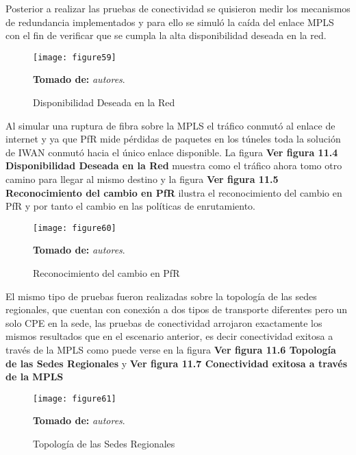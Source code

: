 Posterior a realizar las pruebas de conectividad se quisieron medir los mecanismos de redundancia implementados y para ello se simuló la caída del enlace MPLS con el fin de verificar que se cumpla la alta disponibilidad deseada en la red.


\begin{figure}[htbp]
  \centering
    {\texttt{[image: figure59]}}%
  \caption{ Disponibilidad Deseada en la Red}
  \textbf{Tomado de:} \textit{autores}.
  \label{fig:fig2subfig}
\end{figure}

Al simular una ruptura de fibra sobre la MPLS el tráfico conmutó al enlace de internet y ya que PfR mide pérdidas de paquetes en los túneles toda la solución de IWAN conmutó hacia el único enlace disponible. La figura \textbf{Ver figura 11.4 Disponibilidad Deseada en la Red} muestra como el tráfico ahora tomo otro camino para llegar al mismo destino y la figura \textbf{Ver figura 11.5 Reconocimiento del cambio en PfR} ilustra el reconocimiento del cambio en PfR y por tanto el cambio en las políticas de enrutamiento.
 
 \begin{figure}[htbp]
  \centering
    {\texttt{[image: figure60]}}%
  \caption{ Reconocimiento del cambio en PfR}
  \textbf{Tomado de:} \textit{autores}.
  \label{fig:fig2subfig}
\end{figure}

El mismo tipo de pruebas fueron realizadas sobre la topología de las sedes regionales, que cuentan con conexión a dos tipos de transporte diferentes pero un solo CPE en la sede, las pruebas de conectividad arrojaron exactamente los mismos resultados que en el escenario anterior, es decir conectividad exitosa a través de la MPLS como puede verse en la figura \textbf{Ver figura 11.6 Topología de las Sedes Regionales} y \textbf{Ver figura 11.7 Conectividad exitosa a través de la MPLS}

\begin{figure}[htbp]
  \centering
    {\texttt{[image: figure61]}}%
  \caption{ Topología de las Sedes Regionales}
  \textbf{Tomado de:} \textit{autores}.
  \label{fig:fig2subfig}
\end{figure}

